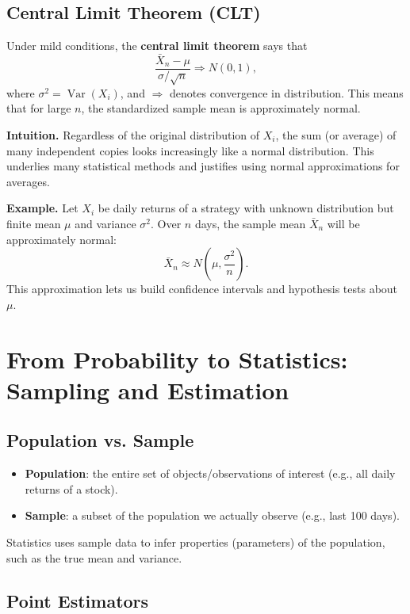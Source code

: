 \documentclass[11pt,a4paper]{article}
\begin{document}
\subsection{Central Limit Theorem (CLT)}

Under mild conditions, the \textbf{central limit theorem} says that
\[
\frac{\bar{X}_n - \mu}{\sigma / \sqrt{n}} \Rightarrow N(0,1),
\]
where \(\sigma^2 = \operatorname{Var}(X_i)\), and \(\Rightarrow\) denotes convergence in distribution.  
This means that for large \(n\), the standardized sample mean is approximately normal.

\textbf{Intuition.}  
Regardless of the original distribution of \(X_i\), the sum (or average) of many independent copies looks increasingly like a normal distribution.  
This underlies many statistical methods and justifies using normal approximations for averages.

\textbf{Example.}  
Let \(X_i\) be daily returns of a strategy with unknown distribution but finite mean \(\mu\) and variance \(\sigma^2\).  
Over \(n\) days, the sample mean \(\bar{X}_n\) will be approximately normal:
\[
\bar{X}_n \approx N\left(\mu, \frac{\sigma^2}{n}\right).
\]
This approximation lets us build confidence intervals and hypothesis tests about \(\mu\).

\newpage

\section{From Probability to Statistics: Sampling and Estimation}

\subsection{Population vs. Sample}

\begin{itemize}
    \item \textbf{Population}: the entire set of objects/observations of interest (e.g., all daily returns of a stock).
    \item \textbf{Sample}: a subset of the population we actually observe (e.g., last 100 days).
\end{itemize}

Statistics uses sample data to infer properties (parameters) of the population, such as the true mean and variance.

\subsection{Point Estimators}
\end{document}
